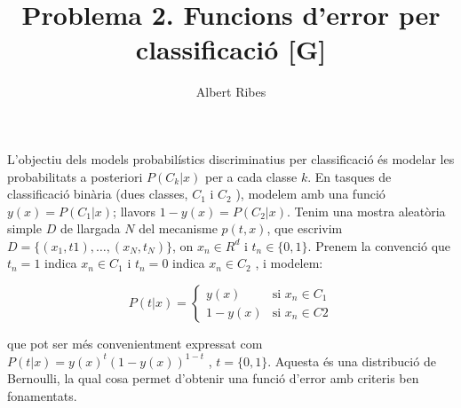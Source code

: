 \documentclass[a4paper]{article}
\author{
Albert Ribes
}
\title{
Problema 2. Funcions d'error per classificació [G]
}
\begin{document}
\maketitle

L'objectiu dels models probabilístics discriminatius per classificació és modelar les probabilitats a posteriori $P(C_k |x)$ per a cada classe $k$. En tasques de classificació binària (dues classes, $C_1$ i $C_2$ ), modelem
amb una funció $y(x) = P(C_1 |x)$; llavors $1 - y(x) = P(C_2 |x)$. Tenim una mostra aleatòria simple $D$ de
llargada $N$ del mecanisme $p(t, x)$, que escrivim $D = \{(x_1 , t1 ), \dots, (x_N , t_N )\}$, on $x_n \in R^d$ i $t_n \in \{ 0, 1\}$.
Prenem la convenció que $t_n = 1$ indica $x_n \in C_1$ i $t_n = 0$ indica $x_n \in C_2$ , i modelem:

\begin{equation*}
  P(t|x) =
  \begin{cases}
      y(x) & \text{si } x_n \in C_1 \\
      1 - y(x) & \text{si } x_n \in C2
  \end{cases}
\end{equation*}

que pot ser més convenientment expressat com $P(t|x) = y(x)^t (1 - y(x))^{1-t}$ , $t = \{ 0, 1\}$. Aquesta és una
distribució de Bernoulli, la qual cosa permet d'obtenir una funció d'error amb criteris ben fonamentats.
\end{document}
